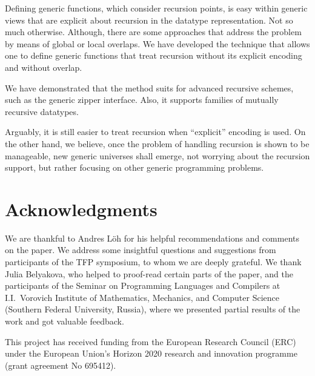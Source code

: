 \documentclass[sigplan,screen,review,anonymous]{acmart}
\begin{document}
Defining generic functions, which consider recursion points, is easy within generic views that are explicit about recursion in the datatype representation. Not so much otherwise. Although, there are some approaches that address the problem by means of global or local overlaps. We have developed the technique that allows one to define generic functions that treat recursion without its explicit encoding and without overlap. 

We have demonstrated that the method suits for advanced recursive schemes, such as the generic zipper interface. Also, it supports families of mutually recursive datatypes.

Arguably, it is still easier to treat recursion when ``explicit'' encoding is used. On the other hand, we believe, once the problem of handling recursion is shown to be manageable, new generic universes shall emerge, not worrying about the recursion support, but rather focusing on other generic programming problems.

\section*{Acknowledgments}
\label{sec:acks}

We are thankful to Andres L\"{o}h for his helpful recommendations and comments on the paper. We address some insightful questions and suggestions from participants of the TFP symposium, to whom we are deeply grateful. We thank Julia Belyakova, who helped to proof-read certain parts of the paper, 
and the participants of the Seminar on Programming Languages and Compilers at 
I.I.~Vorovich Institute of Mathematics, Mechanics, and Computer Science (Southern Federal
University, Russia), where we presented partial results of the work and got valuable feedback.

This project has received funding from the European Research Council (ERC) under the
European Union's Horizon 2020 research and innovation programme (grant agreement No 695412).

%
%
%

%
\end{document}
